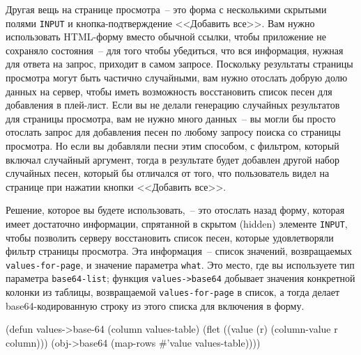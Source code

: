 Другая вещь на странице просмотра~-- это форма с несколькими скрытыми полями \lstinline{INPUT} и
кнопка-подтверждение <<Добавить все>>. Вам нужно использовать HTML-форму вместо обычной
ссылки, чтобы приложение не сохраняло состояния~-- для того чтобы убедиться, что вся
информация, нужная для ответа на запрос, приходит в самом запросе. Поскольку результаты
страницы просмотра могут быть частично случайными, вам нужно отослать добрую долю данных
на сервер, чтобы иметь возможность восстановить список песен для добавления в плей-лист.
Если вы не делали генерацию случайных результатов для страницы просмотра, вам не нужно
много данных~-- вы могли бы просто отослать запрос для добавления песен по любому запросу
поиска со страницы просмотра. Но если вы добавляли песни этим способом, с фильтром, который
включал случайный аргумент, тогда в результате будет добавлен другой набор случайных песен,
который бы отличался от того, что пользователь видел на странице при нажатии кнопки
<<Добавить все>>.

Решение, которое вы будете использовать,~-- это отослать назад форму, которая имеет достаточно
информации, спрятанной в скрытом (hidden) элементе \lstinline{INPUT}, чтобы позволить серверу
восстановить список песен, которые удовлетворяли фильтр страницы просмотра. Эта
информация~-- список значений, возвращаемых \lstinline{values-for-page}, и значение параметра
\lstinline{what}. Это место, где вы используете тип параметра \lstinline{base64-list}; функция
\lstinline{values->base64} добывает значения конкретной колонки из таблицы, возвращаемой
\lstinline{values-for-page} в список, а тогда делает base64-кодированную строку из этого списка
для включения в форму.

\begin{myverb}
(defun values->base-64 (column values-table)
  (flet ((value (r) (column-value r column)))
    (obj->base64 (map-rows #'value values-table))))
\end{myverb}

